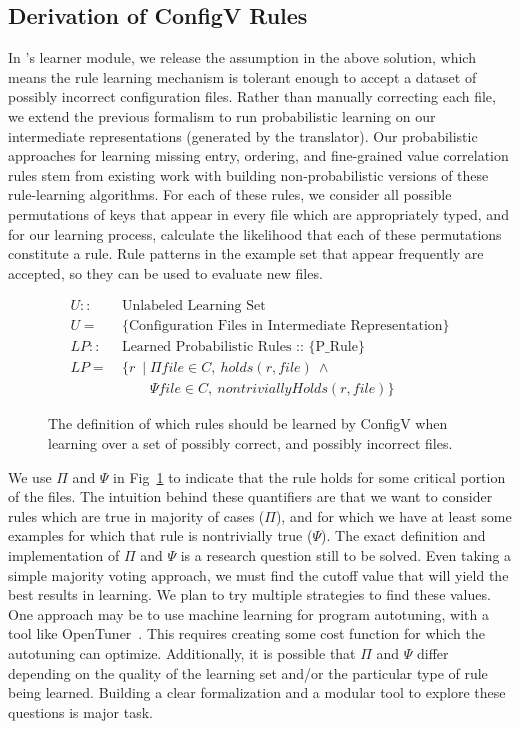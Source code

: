 \subsection{Derivation of ConfigV Rules}
In \app's learner module, we release the assumption in the above
solution, which means the rule learning mechanism is tolerant 
enough to accept a dataset of possibly incorrect configuration files.
Rather than manually correcting each file, 
we extend the previous formalism to run probabilistic learning
on our intermediate representations (generated by the translator).
Our probabilistic approaches for learning missing entry, 
ordering, and fine-grained value correlation rules stem 
from existing work with building 
non-probabilistic versions of these rule-learning algorithms. 
For each of these rules, 
we consider all possible permutations of keys that appear in every 
file which are appropriately typed, and for our learning process, calculate the likelihood that each of 
these permutations constitute a rule. 
Rule patterns in the example set that appear frequently are accepted,
so they can be used to evaluate new files.


\begin{figure}[!h]
\begin{small}
\belowdisplayskip=-15pt
\abovedisplayskip=-2pt
\begin{align*}
U ::&\ \text{Unlabeled Learning Set}\\
U =&\ \text{\{Configuration Files in Intermediate Representation\}}\\
LP ::&\ \text{Learned Probabilistic Rules :: \{P\_Rule\}}\\
LP =&\ \{ r\ \mid \Pi file \in C,\ holds(r,file)\ \land \\
&\qquad  \ \Psi file \in C,\ nontriviallyHolds(r,file)\} 
\end{align*}
\end{small}
\caption{The definition of which rules should be learned by ConfigV when learning over a set of possibly correct, and possibly incorrect files.}
\label{fig:configV}
\end{figure}

We use $\Pi$ and $\Psi$ in Fig~\ref{fig:configV} to indicate that the rule holds for some critical portion of the files.
The intuition behind these quantifiers are that we want to consider rules which are true in majority of cases ($\Pi$), 
and for which we have at least some examples for which that rule is nontrivially true ($\Psi$).
The exact definition and implementation of $\Pi$ and $\Psi$ is a research question still to be solved.
Even taking a simple majority voting approach, we must find the cutoff value that will yield the best results in learning.
We plan to try multiple strategies to find these values.
One approach may be to use machine learning for program autotuning, with a tool like OpenTuner~\cite{ansel:pact:2014}.
This requires creating some cost function for which the autotuning can optimize.
Additionally, it is possible that $\Pi$ and $\Psi$ differ depending on the quality of the learning set and/or the particular type of rule being learned.
Building a clear formalization and a modular tool to explore these questions is major task.

